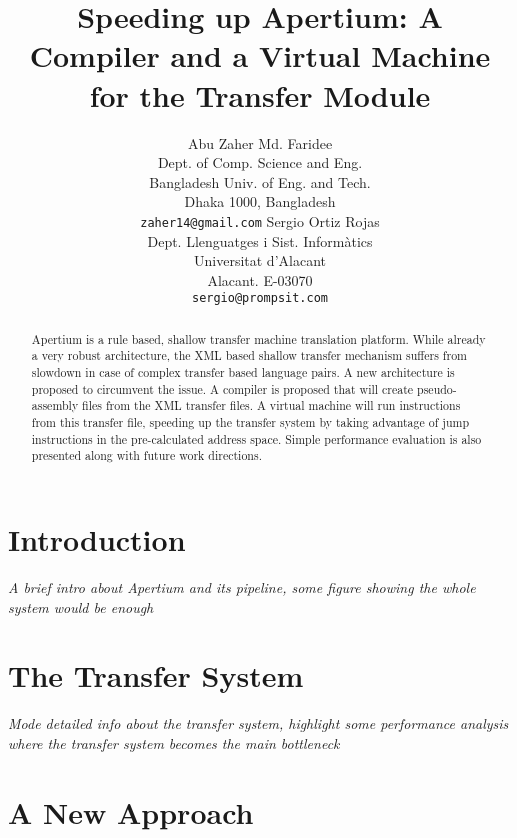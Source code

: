 \documentclass[11pt]{article}
\title{Speeding up Apertium: A Compiler and a Virtual Machine for the
  Transfer Module}
\author{Abu Zaher Md. Faridee\\
  Dept. of Comp. Science and Eng. \\
  Bangladesh Univ. of Eng. and Tech. \\
  Dhaka 1000, Bangladesh \\
  {\tt zaher14@gmail.com} \And
  Sergio Ortiz Rojas \\
  Dept. Llenguatges i Sist. Informàtics \\
  Universitat d'Alacant \\
  Alacant. E-03070 \\  
  {\tt sergio@prompsit.com}}
\date{}
\begin{document}
\maketitle

\begin{abstract}
  Apertium is a rule based, shallow transfer machine translation
  platform. While already a very robust architecture,  the XML based
  shallow transfer mechanism suffers from slowdown in case of complex
  transfer based language pairs. A new architecture is proposed to
  circumvent the issue. A compiler is proposed that will create
  pseudo-assembly files from the XML transfer files. A virtual machine
  will run instructions from this transfer file, speeding up the
  transfer system by taking advantage of jump instructions in the
  pre-calculated address space. Simple performance evaluation is also
  presented  along with future work directions.
\end{abstract}


\section{Introduction}
\label{sec:introduction}



{\itshape{A brief intro about Apertium and its pipeline, some figure
    showing the whole system would be enough}}

\section{The Transfer System}
\label{sec:transfer-system}

{\itshape{Mode detailed info about the transfer system, highlight some
    performance analysis where the transfer system becomes the main
    bottleneck}}

\section{A New Approach}
\label{sec:new-approach}
\end{document}

